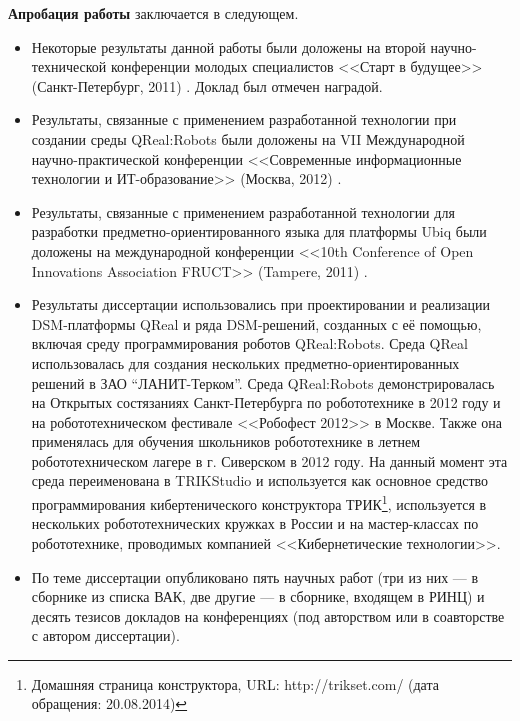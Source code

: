 \textbf{Апробация работы} заключается в следующем.
\begin{itemize}
	\item Некоторые результаты данной работы были доложены на второй 
		научно-технической конференции молодых специалистов <<Старт в будущее>> 
		(Санкт-Петербург, 2011) \cite{kuzenkova2011metamodeling}. Доклад был 
		отмечен наградой.
	\item Результаты, связанные с применением разработанной технологии при 
		создании среды QReal:Robots были доложены на VII Международной 
		научно-практической конференции <<Современные информационные технологии 
		и ИТ-образование>> (Москва, 2012) \cite{litvinov2012robots}.
	\item Результаты, связанные с применением разработанной технологии для 
		разработки предметно-ориентированного языка для платформы Ubiq были доложены 
		на международной конференции <<10th Conference of Open Innovations 
		Association FRUCT>> (Tampere, 2011) \cite{bryksin2011ubiq}.
	\item Результаты диссертации использовались  при проектировании и реализации 
		\ac{DSM}-платформы QReal и ряда \ac{DSM}-решений, созданных с её помощью, включая 
		среду программирования роботов QReal:Robots. Среда QReal использовалась для 
		создания нескольких предметно-ориентированных решений в ЗАО “ЛАНИТ-Терком”. 
		Среда QReal:Robots демонстрировалась на Открытых состязаниях 
		Санкт-Петербурга по робототехнике в 2012 году и на робототехническом 
		фестивале <<Робофест 2012>> в Москве. Также она применялась для обучения 
		школьников робототехнике в летнем робототехническом лагере в 
		г. Сиверском в 2012 году. На данный момент эта среда переименована в 
		TRIKStudio и используется как основное средство программирования 
		кибертенического конструктора 
		ТРИК\footnote{Домашняя страница конструктора, URL: http://trikset.com/ (дата обращения: 20.08.2014)},
		используется в нескольких робототехнических кружках в России и на мастер-классах
		по робототехнике, проводимых компанией <<Кибернетические технологии>>.
	\item По теме диссертации опубликовано пять научных работ (три из них ---
		в сборнике из списка ВАК, две другие --- в сборнике, входящем в РИНЦ) и 
		десять тезисов докладов на конференциях (под авторством или в соавторстве с 
		автором диссертации).
\end{itemize}

